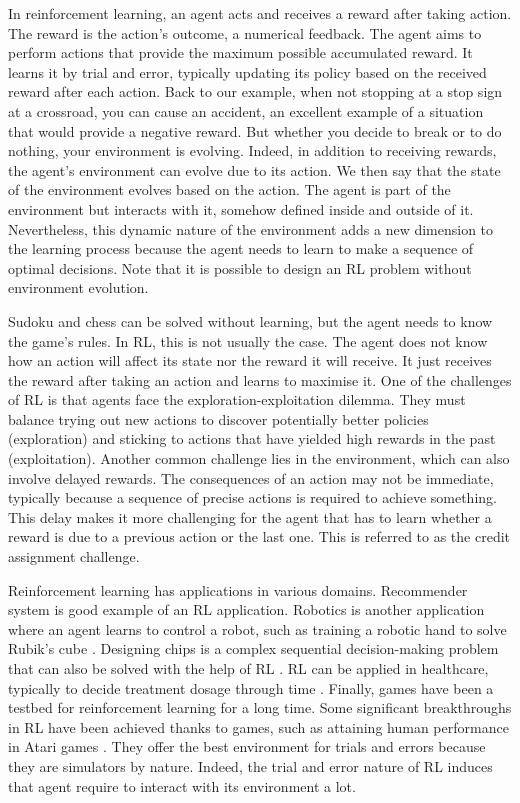 In reinforcement learning, an agent acts and receives a reward after taking action.
The reward is the action's outcome, a numerical feedback.
The agent aims to perform actions that provide the maximum possible accumulated reward.
It learns it by trial and error, typically updating its policy based on the received reward after each action.
Back to our example, when not stopping at a stop sign at a crossroad, you can cause an accident, an excellent example of a situation that would provide a negative reward.
But whether you decide to break or to do nothing, your environment is evolving.
Indeed, in addition to receiving rewards, the agent's environment can evolve due to its action.
We then say that the state of the environment evolves based on the action.
The agent is part of the environment but interacts with it, somehow defined inside and outside of it.
Nevertheless, this dynamic nature of the environment adds a new dimension to the learning process because the agent needs to learn to make a sequence of optimal decisions.
Note that it is possible to design an RL problem without environment evolution.

Sudoku and chess can be solved without learning, but the agent needs to know the game's rules.
In RL, this is not usually the case.
The agent does not know how an action will affect its state nor the reward it will receive.
It just receives the reward after taking an action and learns to maximise it.
One of the challenges of RL is that agents face the exploration-exploitation dilemma.
They must balance trying out new actions to discover potentially better policies (exploration) and sticking to actions that have yielded high rewards in the past (exploitation).
Another common challenge lies in the environment, which can also involve delayed rewards. 
The consequences of an action may not be immediate, typically because a sequence of precise actions is required to achieve something.
This delay makes it more challenging for the agent that has to learn whether a reward is due to a previous action or the last one.
This is referred to as the credit assignment challenge.

Reinforcement learning has applications in various domains.
Recommender system \citep{mcinerney2018explore} is good example of an RL application.
Robotics is another application where an agent learns to control a robot, such as training a robotic hand to solve Rubik's cube \citep{akkaya2019solving}.
Designing chips is a complex sequential decision-making problem that can also be solved with the help of RL \citep{mirhoseini2021graph}. 
RL can be applied in healthcare, typically to decide treatment dosage through time \citep{miotto2018deep}.
Finally, games have been a testbed for reinforcement learning for a long time.
Some significant breakthroughs in RL have been achieved thanks to games, such as attaining human performance in Atari games \citep{Mnih2015}.
They offer the best environment for trials and errors because they are simulators by nature.
Indeed, the trial and error nature of RL induces that agent require to interact with its environment a lot.

